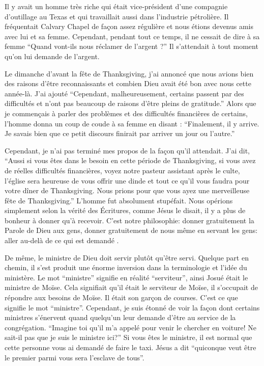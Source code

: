 Il y avait un homme très riche qui était vice-président d’une compagnie d’outillage au Texas et qui travaillait aussi
dans l’industrie pétrolière. Il fréquentait Calvary Chapel de façon assez régulière et nous étions devenus amis avec lui
et sa femme. Cependant, pendant tout ce temps, il ne cessait de dire à sa femme “Quand vont-ils nous réclamer de
l’argent ?” Il s’attendait à tout moment qu’on lui demande de l'argent.

Le dimanche d’avant la fête de Thanksgiving, j’ai annoncé que nous avions bien des raisons d’être reconnaissants et
combien Dieu avait été bon avec nous cette année-là. J’ai ajouté “Cependant, malheureusement, certains passent par
des difficultés et n’ont pas beaucoup de raisons d’être pleins de gratitude.” Alors que je commençais à parler des
problèmes et des difficultés financières de certains, l’homme donna un coup de coude à sa femme en disant :
“Finalement, il y arrive. Je savais bien que ce petit discours finirait par arriver un jour ou l’autre.”

Cependant, je n'ai pas terminé mes propos de la façon qu’il attendait. J'ai dit, “Aussi si vous êtes dans le besoin en
cette période de Thanksgiving, si vous avez de réelles difficultés financières, voyez notre pasteur assistant après le
culte, l’église sera heureuse de vous offrir une dinde et tout ce qu’il vous faudra pour votre dîner de Thanksgiving.
Nous prions pour que vous ayez une merveilleuse fête de Thanksgiving.” L’homme fut absolument stupéfait. Nous
opérions simplement selon la vérité des Écritures, comme Jésus le disait, il y a plus de bonheur à donner qu’à
recevoir. C’est notre philosophie: donner gratuitement la Parole de Dieu aux gens, donner gratuitement de nous
même en servant les gens: aller au-delà de ce qui est demandé .

De même, le ministre de Dieu doit servir plutôt qu’être servi. Quelque part en chemin, il s’est produit une énorme
inversion dans la terminologie et l’idée du ministère. Le mot “ministre” signifie en réalité “serviteur”, ainsi Josué était
le ministre de Moïse. Cela signifiait qu’il était le serviteur de Moïse, il s’occupait de répondre aux besoins de Moïse. Il
était son garçon de courses. C’est ce que signifie le mot “ministre”. Cependant, je suis étonné de voir la façon dont
certains ministres s’énervent quand quelqu’un leur demande d'être au service de la congrégation. “Imagine toi qu’il
m’a appelé pour venir le chercher en voiture! Ne sait-il pas que je suis le ministre ici?” Si vous êtes le ministre, il est
normal que cette personne vous ai demandé de faire le taxi. Jésus a dit “quiconque veut être le premier parmi vous
sera l’esclave de tous”.

